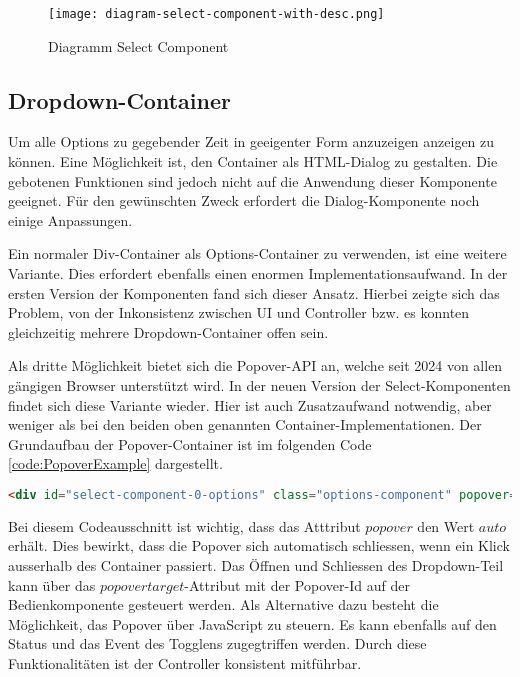 \begin{figure}[!htb]
    \centering
    \texttt{[image: diagram-select-component-with-desc.png]}
    \caption{Diagramm Select Component}
    \label{Abbildung:DiagramSelectComponent}
\end{figure}


\subsection{Dropdown-Container}

Um alle Options zu gegebender Zeit in geeigenter Form anzuzeigen anzeigen zu können.
Eine Möglichkeit ist, den Container als HTML-Dialog zu gestalten.
Die gebotenen Funktionen sind jedoch nicht auf die Anwendung dieser Komponente geeignet.
Für den gewünschten Zweck erfordert die Dialog-Komponente noch einige Anpassungen.

Ein normaler Div-Container als Options-Container zu verwenden, ist eine weitere Variante.
Dies erfordert ebenfalls einen enormen Implementationsaufwand.
In der ersten Version der Komponenten fand sich dieser Ansatz.
Hierbei zeigte sich das Problem, von der Inkonsistenz zwischen UI und Controller bzw. es konnten gleichzeitig mehrere Dropdown-Container offen sein.

Als dritte Möglichkeit bietet sich die Popover-API an, welche seit 2024 von allen gängigen Browser unterstützt wird.
In der neuen Version der Select-Komponenten findet sich diese Variante wieder.
Hier ist auch Zusatzaufwand notwendig, aber weniger als bei den beiden oben genannten Container-Implementationen.
Der Grundaufbau der Popover-Container ist im folgenden Code \ref{code:PopoverExample} dargestellt.

\begin{lstlisting}[language = html, caption = Code: Popover-Container Beispiel, label = code:PopoverExample]
    <div id="select-component-0-options" class="options-component" popover="auto"> </div>
\end{lstlisting}

Bei diesem Codeausschnitt ist wichtig, dass das Atttribut $popover$ den Wert $auto$ erhält.
Dies bewirkt, dass die Popover sich automatisch schliessen, wenn ein Klick ausserhalb des Container passiert.
Das Öffnen und Schliessen des Dropdown-Teil kann über das $popovertarget$-Attribut mit der Popover-Id auf der Bedienkomponente gesteuert werden.
Als Alternative dazu besteht die Möglichkeit, das Popover über JavaScript zu steuern.
Es kann ebenfalls auf den Status und das Event des Togglens zugegtriffen werden.
Durch diese Funktionalitäten ist der Controller konsistent mitführbar.


